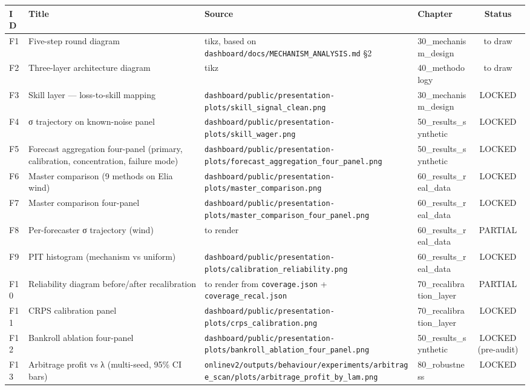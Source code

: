 \documentclass[11pt,a4paper,openany]{report}
\begin{document}
\begin{center}
\small
\begin{tabular}{llllc}
\toprule
\textbf{ID} & \textbf{Title} & \textbf{Source} & \textbf{Chapter} & \textbf{Status} \\
\midrule
F1 & Five-step round diagram & tikz, based on \texttt{dashboard/docs/MECHANISM\_ANALYSIS.md} §2 & 30\_mechanism\_design & to draw \\
F2 & Three-layer architecture diagram & tikz & 40\_methodology & to draw \\
F3 & Skill layer — loss-to-skill mapping & \texttt{dashboard/public/presentation-plots/skill\_signal\_clean.png} & 30\_mechanism\_design & LOCKED \\
F4 & σ trajectory on known-noise panel & \texttt{dashboard/public/presentation-plots/skill\_wager.png} & 50\_results\_synthetic & LOCKED \\
F5 & Forecast aggregation four-panel (primary, calibration, concentration, failure mode) & \texttt{dashboard/public/presentation-plots/forecast\_aggregation\_four\_panel.png} & 50\_results\_synthetic & LOCKED \\
F6 & Master comparison (9 methods on Elia wind) & \texttt{dashboard/public/presentation-plots/master\_comparison.png} & 60\_results\_real\_data & LOCKED \\
F7 & Master comparison four-panel & \texttt{dashboard/public/presentation-plots/master\_comparison\_four\_panel.png} & 60\_results\_real\_data & LOCKED \\
F8 & Per-forecaster σ trajectory (wind) & to render & 60\_results\_real\_data & PARTIAL \\
F9 & PIT histogram (mechanism vs uniform) & \texttt{dashboard/public/presentation-plots/calibration\_reliability.png} & 60\_results\_real\_data & LOCKED \\
F10 & Reliability diagram before/after recalibration & to render from \texttt{coverage.json} + \texttt{coverage\_recal.json} & 70\_recalibration\_layer & PARTIAL \\
F11 & CRPS calibration panel & \texttt{dashboard/public/presentation-plots/crps\_calibration.png} & 70\_recalibration\_layer & LOCKED \\
F12 & Bankroll ablation four-panel & \texttt{dashboard/public/presentation-plots/bankroll\_ablation\_four\_panel.png} & 50\_results\_synthetic & LOCKED (pre-audit) \\
F13 & Arbitrage profit vs λ (multi-seed, 95\% CI bars) & \texttt{onlinev2/outputs/behaviour/experiments/arbitrage\_scan/plots/arbitrage\_profit\_by\_lam.png} & 80\_robustness & LOCKED \\

\end{tabular}
\end{center}
\end{document}

